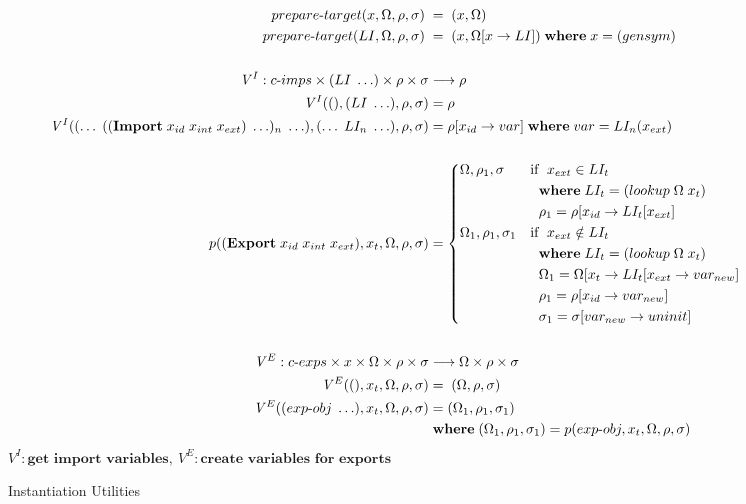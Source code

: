\documentclass[sigplan,screen,anonymous]{acmart}
\def\dash {\text{-}}
\begin{document}
\begin{figure}[tbp]
  \begin{align*}
    prepare\dash target(x, \Omega, \rho, \sigma)\; &=\; (x, \Omega) \\
    prepare\dash target(LI, \Omega, \rho, \sigma)\; &=\; (x, \Omega[x\rightarrow LI])\; \where x = (gensym) \\ \\
    \mathit{V}^I : c\dash imps \times (LI\;\ldots) \times \rho \times \sigma &\longrightarrow \rho \\
    \mathit{V}^I((), (LI\;\ldots), \rho, \sigma) &= \rho \\
    \mathit{V}^I((\ldots\;((\textbf{Import}\; x_{id}\;x_{int}\;x_{ext})\;\ldots)_n\;\ldots), (\ldots\;LI_n\;\ldots), \rho, \sigma) &= \rho[x_{id}\rightarrow var]\; \where var = LI_n(x_{ext}) \\ \\
    p((\textbf{Export}\;x_{id}\;x_{int}\;x_{ext}), x_t, \Omega, \rho, \sigma) &= \begin{cases*}
      \Omega, \rho_1, \sigma & if $\;x_{ext} \in LI_t$ \\
      \;        &\; \where $LI_t = (lookup\; \Omega\; x_t)$ \\
      \;        &\; $\rho_1 = \rho[x_{id}\rightarrow LI_t[x_{ext}]$ \\
        \Omega_1, \rho_1, \sigma_1 & if $\;x_{ext} \notin LI_t$\\
        \;        &\; \where $LI_t = (lookup\; \Omega\; x_t)$ \\
        \;        &\; $\Omega_1 = \Omega[x_t\rightarrow LI_t[x_{ext}\rightarrow var_{new}]$ \\
        \;        &\; $\rho_1 = \rho[x_{id}\rightarrow var_{new}]$ \\
        \;        &\; $\sigma_1 = \sigma[var_{new}\rightarrow uninit]$ \\
    \end{cases*} \\ \\
    \mathit{V}^E : c\dash exps \times x \times \Omega \times \rho \times \sigma &\longrightarrow \Omega \times \rho \times \sigma \\
    \mathit{V}^E((), x_t, \Omega, \rho, \sigma) &=\; (\Omega, \rho, \sigma) \\
    \mathit{V}^E((exp\dash obj\;\ldots), x_t, \Omega, \rho, \sigma) &= (\Omega_1, \rho_1, \sigma_1)\\
    \;        &\; \where (\Omega_1, \rho_1, \sigma_1) = p(exp\dash obj, x_t, \Omega, \rho, \sigma) \\
  \end{align*}
  \hfill \footnotesize $\mathit{V}^I : \textbf{get  import variables},\: \mathit{V}^E : \textbf{create variables for exports}$
\caption{Instantiation Utilities}
\label{fig:inst-utils}
\end{figure}
\end{document}
